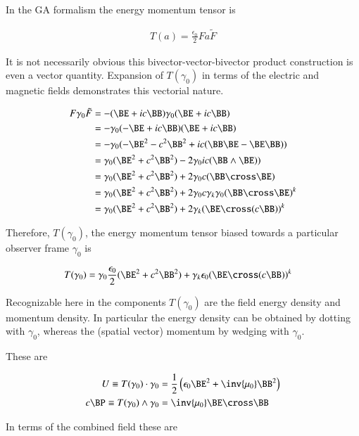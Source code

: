 In the GA formalism the energy momentum tensor is

\begin{align}
T(a) = \frac{\epsilon_0}{2} F a \tilde{F}
\end{align}

It is not necessarily obvious this bivector-vector-bivector product construction is even a vector quantity.  Expansion of $T(\gamma_0)$ in terms of the electric and magnetic fields demonstrates this vectorial nature.

\begin{align*}
F \gamma_0 \tilde{F}
&=
-(\BE + i c \BB) \gamma_0 (\BE + i c \BB) \\
&=
-\gamma_0 (-\BE + i c \BB) (\BE + i c \BB) \\
&=
-\gamma_0 (-\BE^2 - c^2 \BB^2 + i c (\BB \BE - \BE \BB) ) \\
&=
\gamma_0 (\BE^2 + c^2 \BB^2) - 2 \gamma_0 i c (\BB \wedge \BE) ) \\
&=
\gamma_0 (\BE^2 + c^2 \BB^2) + 2 \gamma_0 c (\BB \cross \BE) \\
&=
\gamma_0 (\BE^2 + c^2 \BB^2) + 2 \gamma_0 c \gamma_k \gamma_0 (\BB \cross \BE)^k \\
&=
\gamma_0 (\BE^2 + c^2 \BB^2) + 2 \gamma_k (\BE \cross (c \BB))^k \\
\end{align*}

Therefore, $T(\gamma_0)$, the energy momentum tensor biased towards a particular observer frame $\gamma_0$
is

\begin{align}
T(\gamma_0)
&=
\gamma_0 \frac{\epsilon_0}{2} (\BE^2 + c^2 \BB^2) + \gamma_k \epsilon_0 (\BE \cross (c \BB))^k
\end{align}

Recognizable here in the components $T(\gamma_0)$ are the field energy density and momentum density.  In particular the energy density can be obtained by dotting with $\gamma_0$, whereas the (spatial vector) momentum by wedging with $\gamma_0$.

These are

\begin{align}
U \equiv T(\gamma_0) \cdot \gamma_0 &= \frac{1}{2} \left( \epsilon_0 \BE^2 + \inv{\mu_0} \BB^2 \right) \\
c \BP \equiv T(\gamma_0) \wedge \gamma_0 &= \inv{\mu_0} \BE \cross \BB
\end{align}

In terms of the combined field these are

